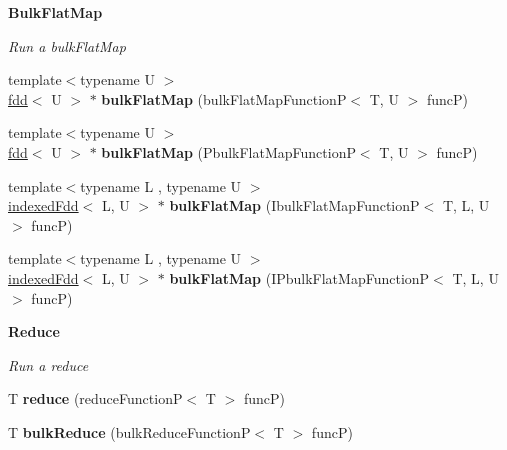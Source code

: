 \begin{Indent}{\bf Bulk\+Flat\+Map}\par
{\em Run a bulk\+Flat\+Map }\begin{DoxyCompactItemize}
\item 
\hypertarget{classfaster_1_1fdd_a6f87b4e650b28ea32c363f6d902babb1}{}\label{classfaster_1_1fdd_a6f87b4e650b28ea32c363f6d902babb1} 
{\footnotesize template$<$typename U $>$ }\\\hyperlink{classfaster_1_1fdd}{fdd}$<$ U $>$ $\ast$ {\bfseries bulk\+Flat\+Map} (bulk\+Flat\+Map\+FunctionP$<$ T, U $>$ funcP)
\item 
\hypertarget{classfaster_1_1fdd_a77058c1365a8696105acaf1468e8d3b4}{}\label{classfaster_1_1fdd_a77058c1365a8696105acaf1468e8d3b4} 
{\footnotesize template$<$typename U $>$ }\\\hyperlink{classfaster_1_1fdd}{fdd}$<$ U $>$ $\ast$ {\bfseries bulk\+Flat\+Map} (Pbulk\+Flat\+Map\+FunctionP$<$ T, U $>$ funcP)
\item 
\hypertarget{classfaster_1_1fdd_adfcb736f7161db476dbbb275f1d08659}{}\label{classfaster_1_1fdd_adfcb736f7161db476dbbb275f1d08659} 
{\footnotesize template$<$typename L , typename U $>$ }\\\hyperlink{classfaster_1_1indexedFdd}{indexed\+Fdd}$<$ L, U $>$ $\ast$ {\bfseries bulk\+Flat\+Map} (Ibulk\+Flat\+Map\+FunctionP$<$ T, L, U $>$ funcP)
\item 
\hypertarget{classfaster_1_1fdd_af16d4811371f6dbcfbb717a73a182d48}{}\label{classfaster_1_1fdd_af16d4811371f6dbcfbb717a73a182d48} 
{\footnotesize template$<$typename L , typename U $>$ }\\\hyperlink{classfaster_1_1indexedFdd}{indexed\+Fdd}$<$ L, U $>$ $\ast$ {\bfseries bulk\+Flat\+Map} (I\+Pbulk\+Flat\+Map\+FunctionP$<$ T, L, U $>$ funcP)
\end{DoxyCompactItemize}
\end{Indent}
\begin{Indent}{\bf Reduce}\par
{\em Run a reduce }\begin{DoxyCompactItemize}
\item 
\hypertarget{classfaster_1_1fdd_a1e828ad9a768db382aef2adf878aa1b2}{}\label{classfaster_1_1fdd_a1e828ad9a768db382aef2adf878aa1b2} 
T {\bfseries reduce} (reduce\+FunctionP$<$ T $>$ funcP)
\item 
\hypertarget{classfaster_1_1fdd_a8f133f23bd653329f44290ebda70bb9b}{}\label{classfaster_1_1fdd_a8f133f23bd653329f44290ebda70bb9b} 
T {\bfseries bulk\+Reduce} (bulk\+Reduce\+FunctionP$<$ T $>$ funcP)
\end{DoxyCompactItemize}
\end{Indent}
